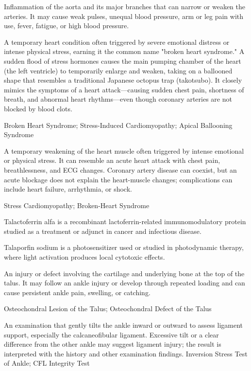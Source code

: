  Inflammation of the aorta and its major branches that can narrow or weaken the arteries. It may cause weak pulses, unequal blood pressure, arm or leg pain with use, fever, fatigue, or high blood pressure.

 A temporary heart condition often triggered by severe emotional distress or intense physical stress, earning it the common name "broken heart syndrome." A sudden flood of stress hormones causes the main pumping chamber of the heart (the left ventricle) to temporarily enlarge and weaken, taking on a ballooned shape that resembles a traditional Japanese octopus trap (takotsubo). It closely mimics the symptoms of a heart attack---causing sudden chest pain, shortness of breath, and abnormal heart rhythms---even though coronary arteries are not blocked by blood clots.

\synonyms
Broken Heart Syndrome; Stress-Induced Cardiomyopathy; Apical Ballooning Syndrome

 A temporary weakening of the heart muscle often triggered by intense emotional or physical stress. It can resemble an acute heart attack with chest pain, breathlessness, and ECG changes. Coronary artery disease can coexist, but an acute blockage does not explain the heart-muscle changes; complications can include heart failure, arrhythmia, or shock.

\synonyms
Stress Cardiomyopathy; Broken-Heart Syndrome

 Talactoferrin alfa is a recombinant lactoferrin-related immunomodulatory protein studied as a treatment or adjunct in cancer and infectious disease.

 Talaporfin sodium is a photosensitizer used or studied in photodynamic therapy, where light activation produces local cytotoxic effects.

 An injury or defect involving the cartilage and underlying bone at the top of the talus. It may follow an ankle injury or develop through repeated loading and can cause persistent ankle pain, swelling, or catching.

\synonyms
Osteochondral Lesion of the Talus; Osteochondral Defect of the Talus

 An examination that gently tilts the ankle inward or outward to assess ligament support, especially the calcaneofibular ligament. Excessive tilt or a clear difference from the other ankle may suggest ligament injury; the result is interpreted with the history and other examination findings.
\synonyms
Inversion Stress Test of Ankle; CFL Integrity Test

